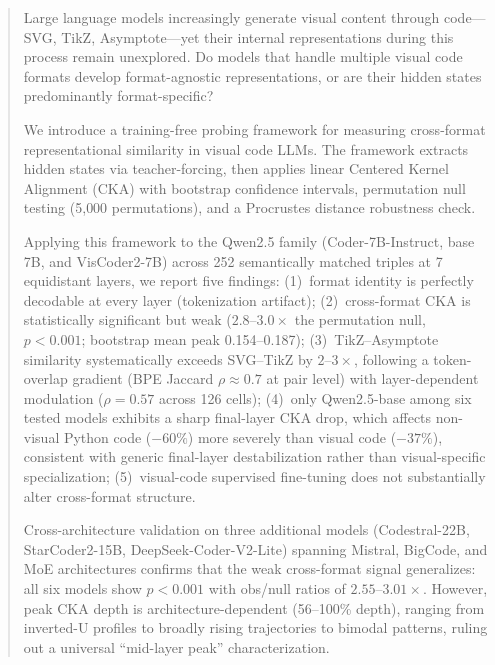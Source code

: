 \begin{abstract}
Large language models increasingly generate visual content through code---SVG, TikZ, Asymptote---yet their internal representations during this process remain unexplored.
Do models that handle multiple visual code formats develop format-agnostic representations, or are their hidden states predominantly format-specific?

We introduce a training-free probing framework for measuring cross-format representational similarity in visual code LLMs.
The framework extracts hidden states via teacher-forcing, then applies linear Centered Kernel Alignment (CKA) with bootstrap confidence intervals, permutation null testing (5{,}000 permutations), and a Procrustes distance robustness check.

Applying this framework to the Qwen2.5 family (Coder-7B-Instruct, base 7B, and VisCoder2-7B) across 252 semantically matched triples at 7 equidistant layers, we report five findings:
(1)~format identity is perfectly decodable at every layer (tokenization artifact);
(2)~cross-format CKA is statistically significant but weak ($2.8$--$3.0\times$ the permutation null, $p < 0.001$; bootstrap mean peak 0.154--0.187);
(3)~TikZ--Asymptote similarity systematically exceeds SVG--TikZ by $2$--$3\times$, following a token-overlap gradient (BPE Jaccard $\rho \approx 0.7$ at pair level) with layer-dependent modulation ($\rho = 0.57$ across 126 cells);
(4)~only Qwen2.5-base among six tested models exhibits a sharp final-layer CKA drop, which affects non-visual Python code ($-60\%$) more severely than visual code ($-37\%$), consistent with generic final-layer destabilization rather than visual-specific specialization;
(5)~visual-code supervised fine-tuning does not substantially alter cross-format structure.

Cross-architecture validation on three additional models (Codestral-22B, StarCoder2-15B, DeepSeek-Coder-V2-Lite) spanning Mistral, BigCode, and MoE architectures confirms that the weak cross-format signal generalizes: all six models show $p < 0.001$ with obs/null ratios of $2.55$--$3.01\times$.
However, peak CKA depth is architecture-dependent (56--100\% depth), ranging from inverted-U profiles to broadly rising trajectories to bimodal patterns, ruling out a universal ``mid-layer peak'' characterization.


\end{abstract}
